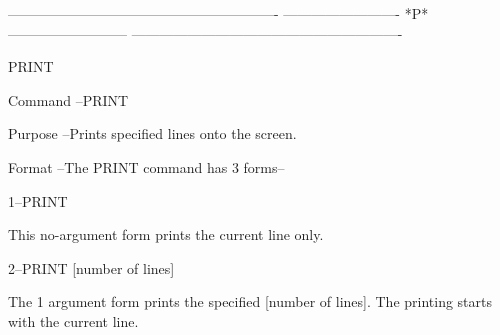  
 
 
 
 
 
 
 
 
 
 
 
 
 
 
 
 
 
 
 
 
 
 
 
 
 
 
 
 
 
 
 
 
 
 
 
 
 
 
 
 
 
 
 
 
 
 
 
 
 
 
 
 
 
 
 
 
 
 
 
 
 
 
 
 
 
 
 
 
 
 
 
 
 
 
 
 
 
 
 
 
 
----------------------------------------------------------
-------------------------  *P*  --------------------------
----------------------------------------------------------
 
PRINT
 
Command --PRINT
 
Purpose --Prints specified lines onto the screen.
 
Format  --The PRINT command has 3 forms--
 
       1--PRINT
 
          This no-argument form prints the
          current line only.
 
       2--PRINT [number of lines]
 
          The 1 argument form prints the specified
          [number of lines].  The printing starts with
          the current line.
 
